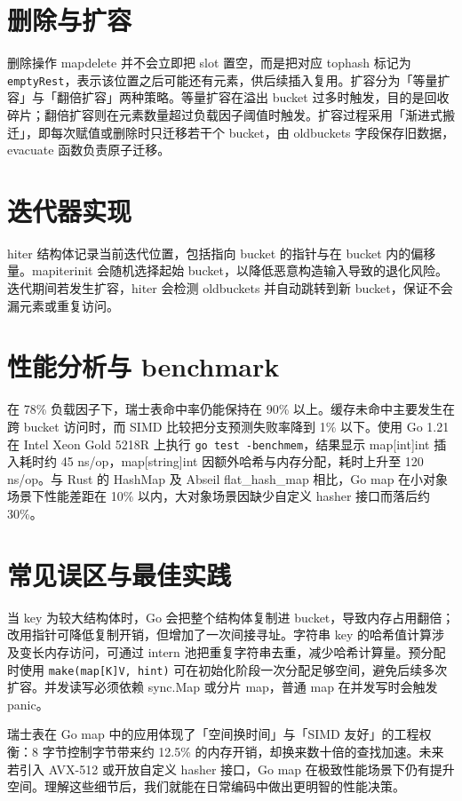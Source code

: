 \chapter{删除与扩容}
删除操作 mapdelete 并不会立即把 slot 置空，而是把对应 tophash 标记为 \texttt{emptyRest}，表示该位置之后可能还有元素，供后续插入复用。扩容分为「等量扩容」与「翻倍扩容」两种策略。等量扩容在溢出 bucket 过多时触发，目的是回收碎片；翻倍扩容则在元素数量超过负载因子阈值时触发。扩容过程采用「渐进式搬迁」，即每次赋值或删除时只迁移若干个 bucket，由 oldbuckets 字段保存旧数据，evacuate 函数负责原子迁移。\par
\chapter{迭代器实现}
hiter 结构体记录当前迭代位置，包括指向 bucket 的指针与在 bucket 内的偏移量。mapiterinit 会随机选择起始 bucket，以降低恶意构造输入导致的退化风险。迭代期间若发生扩容，hiter 会检测 oldbuckets 并自动跳转到新 bucket，保证不会漏元素或重复访问。\par
\chapter{性能分析与 benchmark}
在 78\%{} 负载因子下，瑞士表命中率仍能保持在 90\%{} 以上。缓存未命中主要发生在跨 bucket 访问时，而 SIMD 比较把分支预测失败率降到 1\%{} 以下。使用 Go 1.21 在 Intel Xeon Gold 5218R 上执行 \texttt{go test -benchmem}，结果显示 map[int]int 插入耗时约 45 ns/op，map[string]int 因额外哈希与内存分配，耗时上升至 120 ns/op。与 Rust 的 HashMap 及 Abseil flat\_{}hash\_{}map 相比，Go map 在小对象场景下性能差距在 10\%{} 以内，大对象场景因缺少自定义 hasher 接口而落后约 30\%{}。\par
\chapter{常见误区与最佳实践}
当 key 为较大结构体时，Go 会把整个结构体复制进 bucket，导致内存占用翻倍；改用指针可降低复制开销，但增加了一次间接寻址。字符串 key 的哈希值计算涉及变长内存访问，可通过 intern 池把重复字符串去重，减少哈希计算量。预分配时使用 \texttt{make(map[K]V, hint)} 可在初始化阶段一次分配足够空间，避免后续多次扩容。并发读写必须依赖 sync.Map 或分片 map，普通 map 在并发写时会触发 panic。\par
瑞士表在 Go map 中的应用体现了「空间换时间」与「SIMD 友好」的工程权衡：8 字节控制字节带来约 12.5\%{} 的内存开销，却换来数十倍的查找加速。未来若引入 AVX-512 或开放自定义 hasher 接口，Go map 在极致性能场景下仍有提升空间。理解这些细节后，我们就能在日常编码中做出更明智的性能决策。\par
